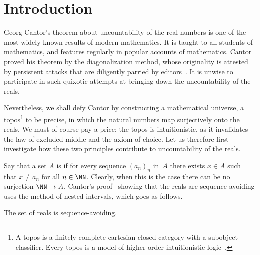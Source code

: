 \section{Introduction}
\label{sec:introduction}

Georg Cantor's theorem \cite{cantor74:_ueber_eigen_inbeg_zahlen} about uncountability of the real numbers is one of the most widely known results of modern mathematics.
%
It is taught to all students of mathematics, and features regularly in popular accounts of mathematics.
%
Cantor proved his theorem by the diagonalization method, whose originality is attested by persistent attacks that are diligently parried by editors~\cite{hodges98:_editor_recal_some_hopel_paper}.
%
It is unwise to participate in such quixotic attempts at bringing down the uncountability of the reals.

Nevertheless, we shall defy Cantor by constructing a mathematical universe, a topos\footnote{A topos is a finitely complete cartesian-closed category with a subobject classifier. Every topos is a model of higher-order intuitionistic logic~\cite{jim86:_introd_higher_order_categ_logic,johnstone02:_sketc_eleph}.} to be precise, in which the natural numbers map surjectively onto the reals.
%
We must of course pay a price: the topos is intuitionistic, as it invalidates the law of excluded middle and the axiom of choice.
%
Let us therefore first investigate how these two principles contribute to uncountability of the reals.

Say that a set $A$ is  if for every sequence $(a_n)_n$ in~$A$ there exists $x \in A$ such that $x \neq a_n$ for all $n \in \NN$. Clearly, when this is the case there can be no surjection $\NN \to A$.
%
Cantor's proof~\cite{cantor74:_ueber_eigen_inbeg_zahlen} showing that the reals are sequence-avoiding uses the method of nested intervals, which goes as follows.

\begin{theorem}
  \label{thm:R-uncountable}
  The set of reals is sequence-avoiding.
\end{theorem}

